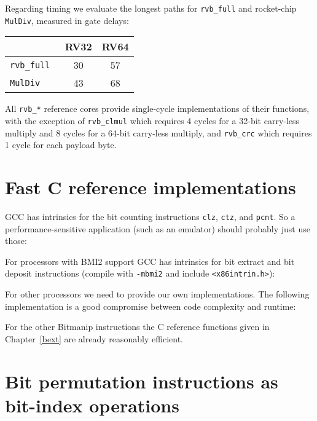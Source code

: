 Regarding timing we evaluate the longest paths for {\tt rvb\_full} and
rocket-chip {\tt MulDiv}, measured in gate delays:

\begin{center}
\begin{tabular}{lcc}
& RV32 & RV64 \\
\hline
\tt rvb\_full & 30 & 57 \\
\tt MulDiv & 43 & 68 \\
\end{tabular}
\end{center}

All {\tt rvb\_*} reference cores provide single-cycle implementations of their functions,
with the exception of {\tt rvb\_clmul} which requires 4 cycles for a 32-bit
carry-less multiply and 8 cycles for a 64-bit carry-less multiply, and {\tt rvb\_crc}
which requires 1 cycle for each payload byte.


\section{Fast C reference implementations}
\label{fastc}

GCC has intrinsics for the bit counting instructions {\tt clz}, {\tt ctz}, and
{\tt pcnt}.  So a performance-sensitive application (such as an emulator)
should probably just use those:



For processors with BMI2 support GCC has intrinsics for bit extract and bit
deposit instructions (compile with {\tt -mbmi2} and include {\tt <x86intrin.h>}):



For other processors we need to provide our own implementations. The following
implementation is a good compromise between code complexity and runtime:



For the other Bitmanip instructions the C reference functions given in Chapter~\ref{bext}
are already reasonably efficient.


\section{Bit permutation instructions as bit-index operations}

